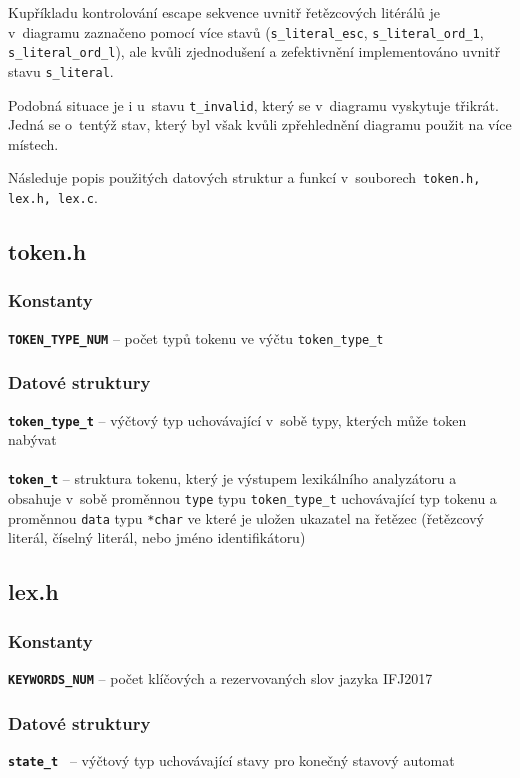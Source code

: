 \documentclass[11pt,a4paper]{article}
\begin{document}
Kupříkladu kontrolování escape sekvence uvnitř řetězcových litérálů je v~diagramu zaznačeno pomocí více stavů (\verb|s_literal_esc|, \verb|s_literal_ord_1|, \verb|s_literal_ord_l|), ale kvůli zjednodušení a zefektivnění implementováno uvnitř stavu \verb|s_literal|.

Podobná situace je i u~stavu \verb|t_invalid|, který se v~diagramu vyskytuje třikrát. Jedná se o~tentýž stav, který byl však kvůli zpřehlednění diagramu použit na více místech.

Následuje popis použitých datových struktur a funkcí v~souborech\ \verb|token.h, lex.h, lex.c|.

\subsection{token.h}

\subsubsection*{Konstanty}

\cprotect\textbf{\verb|TOKEN_TYPE_NUM|} -- počet typů tokenu ve výčtu \verb|token_type_t|

\subsubsection*{Datové struktury}
\cprotect\textbf{\verb|token_type_t|}  -- výčtový typ uchovávající v~sobě typy, kterých může token nabývat \\ \\
\noindent
\cprotect\textbf{\verb|token_t|}  -- struktura tokenu, který je výstupem lexikálního analyzátoru a obsahuje v~sobě proměnnou \verb|type| typu \verb|token_type_t| uchovávající typ tokenu a proměnnou \verb|data| typu \verb|*char| ve které je uložen ukazatel na řetězec (řetězcový literál, číselný literál, nebo jméno identifikátoru) 

\subsection{lex.h}
\subsubsection*{Konstanty}

\cprotect\textbf{\verb|KEYWORDS_NUM|} -- počet klíčových a rezervovaných slov jazyka IFJ2017

\subsubsection*{Datové struktury}
\cprotect\textbf{\verb|state_t |} -- výčtový typ uchovávající stavy pro konečný stavový automat
\end{document}
